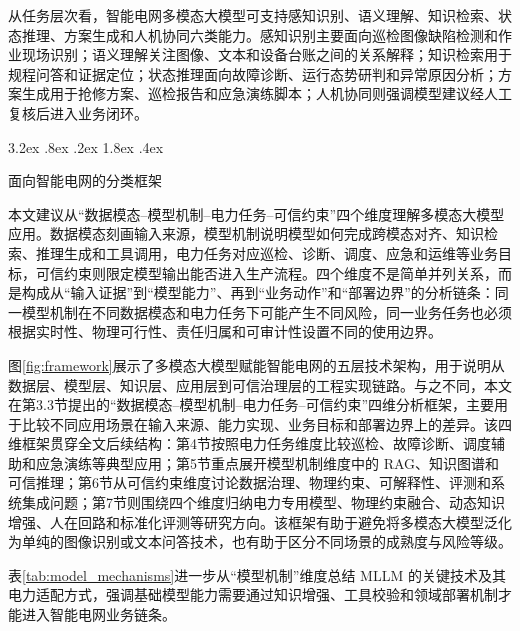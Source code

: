 \documentclass[10.5pt,compsoc]{CjC}
\makeatletter
\renewcommand\subsection{\@startsection{subsection}{2}{\z@}%
  {3.2ex \@plus .8ex \@minus .2ex}%
  {1.8ex \@plus .4ex}%
  {\normalfont\zihao{5}\heiti\bfseries\raggedright}}
\theoremstyle{mystyle}
\makeatother
\begin{document}
从任务层次看，智能电网多模态大模型可支持感知识别、语义理解、知识检索、状态推理、方案生成和人机协同六类能力。感知识别主要面向巡检图像缺陷检测和作业现场识别；语义理解关注图像、文本和设备台账之间的关系解释；知识检索用于规程问答和证据定位；状态推理面向故障诊断、运行态势研判和异常原因分析；方案生成用于抢修方案、巡检报告和应急演练脚本；人机协同则强调模型建议经人工复核后进入业务闭环\cite{ghafari2025comprehensive,mirshekali2025review,xiang2025mllm_power}。


\subsection{面向智能电网的分类框架}

本文建议从``数据模态--模型机制--电力任务--可信约束''四个维度理解多模态大模型应用。数据模态刻画输入来源，模型机制说明模型如何完成跨模态对齐、知识检索、推理生成和工具调用，电力任务对应巡检、诊断、调度、应急和运维等业务目标，可信约束则限定模型输出能否进入生产流程。四个维度不是简单并列关系，而是构成从``输入证据''到``模型能力''、再到``业务动作''和``部署边界''的分析链条：同一模型机制在不同数据模态和电力任务下可能产生不同风险，同一业务任务也必须根据实时性、物理可行性、责任归属和可审计性设置不同的使用边界。

图\ref{fig:framework}展示了多模态大模型赋能智能电网的五层技术架构，用于说明从数据层、模型层、知识层、应用层到可信治理层的工程实现链路。与之不同，本文在第3.3节提出的``数据模态--模型机制--电力任务--可信约束''四维分析框架，主要用于比较不同应用场景在输入来源、能力实现、业务目标和部署边界上的差异。该四维框架贯穿全文后续结构：第4节按照电力任务维度比较巡检、故障诊断、调度辅助和应急演练等典型应用；第5节重点展开模型机制维度中的 RAG、知识图谱和可信推理；第6节从可信约束维度讨论数据治理、物理约束、可解释性、评测和系统集成问题；第7节则围绕四个维度归纳电力专用模型、物理约束融合、动态知识增强、人在回路和标准化评测等研究方向。该框架有助于避免将多模态大模型泛化为单纯的图像识别或文本问答技术，也有助于区分不同场景的成熟度与风险等级。

表\ref{tab:model_mechanisms}进一步从``模型机制''维度总结 MLLM 的关键技术及其电力适配方式，强调基础模型能力需要通过知识增强、工具校验和领域部署机制才能进入智能电网业务链条。
\end{document}
